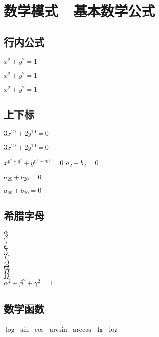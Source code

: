\documentclass[]{ctexart}
\begin{document}
 	
	\section{数学模式—基本数学公式}
	
	\subsection{行内公式}
	$ x^2+y^2=1 $
	
	\( x^2+y^2=1 \)
	
	\begin{math}
		x^2+y^2=1
	\end{math}
 	
 	\subsection{上下标}
 	$ 3x^20 + 2y^10 =0 $ 
 	
 	$ 3x^{20} + 2y^{10} =0 $
 	
 	$ x^{p^2+q^2}+y^{n^2+m^2}=0 $
 	$ a_2 + b_2 =0 $
 	
 	$ a_20 + b_20 =0 $
 	
 	$ a_{20} + b_{20} =0 $
 	
 	\subsection{希腊字母}
 	$ \alpha $		\\
 	$ \beta $		\\
 	$ \gamma $		\\
 	$ \epsilon $	\\
 	$ \pi $			\\
 	$ \omega $		\\
 	$ \Gamma $		\\
 	$ \Delta $		\\
 	$ \Theta $		\\
 	$ \Pi $			\\
 	$ \Omega $		\\
 	
 	$ \alpha^2 + \beta^2 + \gamma^2 =1 $
 	
 	\subsection{数学函数}
 	$ \log $
 	$ \sin $
 	$ \cos $
 	$ \arcsin $
 	$ \arccos $
 	$ \ln $
 	$ \log $
 	
\end{document}
